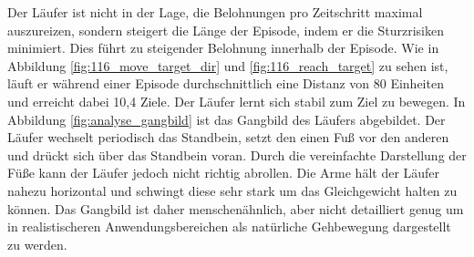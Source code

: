 Der Läufer ist nicht in der Lage, die Belohnungen pro Zeitschritt maximal auszureizen, sondern steigert die Länge der Episode, indem er die Sturzrisiken minimiert. Dies führt zu steigender Belohnung innerhalb der Episode. Wie in Abbildung \ref{fig:116_move_target_dir} und \ref{fig:116_reach_target} zu sehen ist, läuft er während einer Episode durchschnittlich eine Distanz von 80 Einheiten und erreicht dabei 10,4 Ziele. Der Läufer lernt sich stabil zum Ziel zu bewegen. In Abbildung \ref{fig:analyse_gangbild} ist das Gangbild des Läufers abgebildet. Der Läufer wechselt periodisch das Standbein, setzt den einen Fuß vor den anderen und drückt sich über das Standbein voran. Durch die vereinfachte Darstellung der Füße kann der Läufer jedoch nicht richtig abrollen. Die Arme hält der Läufer nahezu horizontal und schwingt diese sehr stark um das Gleichgewicht halten zu können. Das Gangbild ist daher menschenähnlich, aber nicht detailliert genug um in realistischeren Anwendungsbereichen als natürliche Gehbewegung dargestellt zu werden.

